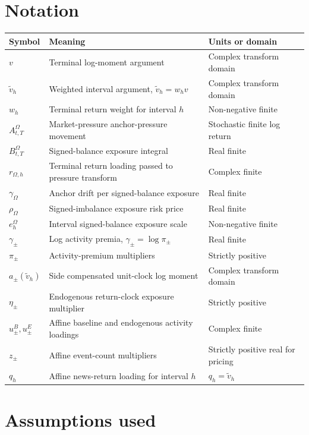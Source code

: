 \documentclass[11pt]{article}
\begin{document}
\section{Notation}

\begin{tabularx}{\textwidth}{lXX}
\toprule
Symbol & Meaning & Units or domain\\
\midrule
\(v\) & Terminal log-moment argument & Complex transform domain\\
\(\tilde v_h\) & Weighted interval argument, \(\tilde v_h=w_hv\) & Complex transform domain\\
\(w_h\) & Terminal return weight for interval \(h\) & Non-negative finite\\
\(A_{t,T}^{\Omega}\) & Market-pressure anchor-pressure movement & Stochastic finite log return\\
\(B_{t,T}^{\Omega}\) & Signed-balance exposure integral & Real finite\\
\(r_{\Omega,h}\) & Terminal return loading passed to pressure transform & Complex finite\\
\(\gamma_\Omega\) & Anchor drift per signed-balance exposure & Real finite\\
\(\rho_\Omega\) & Signed-imbalance exposure risk price & Real finite\\
\(e_h^\Omega\) & Interval signed-balance exposure scale & Non-negative finite\\
\(\gamma_\pm\) & Log activity premia, \(\gamma_\pm=\log\pi_\pm\) & Real finite\\
\(\pi_\pm\) & Activity-premium multipliers & Strictly positive\\
\(a_\pm(\tilde v_h)\) & Side compensated unit-clock log moment & Complex transform domain\\
\(\eta_\pm\) & Endogenous return-clock exposure multiplier & Strictly positive\\
\(u_\pm^B,u_\pm^E\) & Affine baseline and endogenous activity loadings & Complex finite\\
\(z_\pm\) & Affine event-count multipliers & Strictly positive real for pricing\\
\(q_h\) & Affine news-return loading for interval \(h\) & \(q_h=\tilde v_h\)\\
\bottomrule
\end{tabularx}

\section{Assumptions used}
\end{document}
